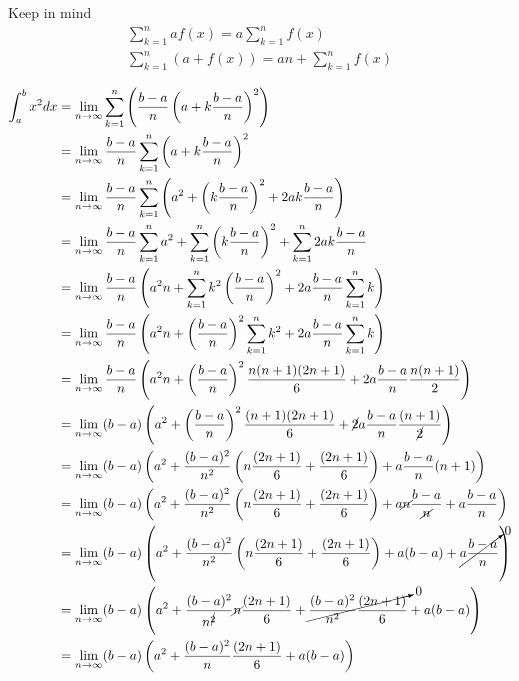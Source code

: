 \documentclass[letterpaper]{article}
\begin{document}
Keep in mind
\[\begin{aligned}
   \sum_{k=1}^n af(x) = a\sum_{k=1}^n f(x)\\
   \sum_{k=1}^n \left( a+f(x)\right)  = an + \sum_{k=1}^{n} f(x)
   \end{aligned}\]


\[\begin{aligned}
   \int_a^b x^2 dx &= \lim_{n\to \infty} \sum_{k=1}^n \left( \frac{b-a}{n} \left( a+k\frac{b-a}{n}\right) ^2\right)\\
   &= \lim_{n\to \infty} \frac{b-a}{n} \sum_{k=1}^n \left( a+k\frac{b-a}{n}\right) ^2\\
   &= \lim_{n\to \infty} \frac{b-a}{n} \sum_{k=1}^n \left( a^2+\left( k\frac{b-a}{n}\right) ^2 + 2ak\frac{b-a}{n}\right) \\
   &= \lim_{n\to \infty} \frac{b-a}{n} \sum_{k=1}^n a^2+\sum_{k=1}^n \left( k\frac{b-a}{n}\right) ^2 +\sum_{k=1}^n  2ak\frac{b-a}{n} \\
   &= \lim_{n\to \infty} \frac{b-a}{n} \left( a^2n +\sum_{k=1}^n k^2\left(\frac{b-a}{n}\right)^2 +2a\frac{b-a}{n}\sum_{k=1}^n k\right)  \\
   &= \lim_{n\to \infty} \frac{b-a}{n} \left( a^2n + \left(\frac{b-a}{n}\right)^2\sum_{k=1}^n k^2 +2a\frac{b-a}{n}\sum_{k=1}^n k\right)  \\
   &= \lim_{n\to \infty} \frac{b-a}{n} \left( a^2n + \left(\frac{b-a}{n}\right)^2 \frac{n(n+1)(2n+1)}{6} +2a\frac{b-a}{n}\frac{n(n+1)}{2}\right)  \\
   &= \lim_{n\to \infty} (b-a) \left( a^2 + \left(\frac{b-a}{n}\right)^2 \frac{(n+1)(2n+1)}{6} +\cancel{2}a\frac{b-a}{n}\frac{(n+1)}{\cancel{2}}\right)  \\
   &= \lim_{n\to \infty} (b-a) \left( a^2 + \frac{(b-a)^2}{n^2} \left( n\frac{(2n+1)}{6} + \frac{(2n+1)}{6}\right) +a\frac{b-a}{n}(n+1)\right)  \\
   &= \lim_{n\to \infty} (b-a) \left( a^2 + \frac{(b-a)^2}{n^2} \left( n\frac{(2n+1)}{6} + \frac{(2n+1)}{6}\right) +a\cancel{n}\frac{b-a}{\cancel{n}}+a\frac{b-a}{n}\right)  \\
   &= \lim_{n\to \infty} (b-a) \left( a^2 + \frac{(b-a)^2}{n^2} \left( n\frac{(2n+1)}{6} + \frac{(2n+1)}{6}\right) +a(b-a) +\cancelto{0}{a\frac{b-a}{n}}\right)  \\
   &= \lim_{n\to \infty} (b-a) \left( a^2 + \frac{(b-a)^2}{n^{\cancel{2}} } \cancel{n} \frac{(2n+1)}{6} + \cancelto{0}{\frac{(b-a)^2}{n^2} \frac{(2n+1)}{6}} +a(b-a) \right)  \\
   &= \lim_{n\to \infty} (b-a) \left( a^2 + \frac{(b-a)^2}{n} \frac{(2n+1)}{6} + a(b-a) \right)  \\

\end{aligned}\]
\end{document}
